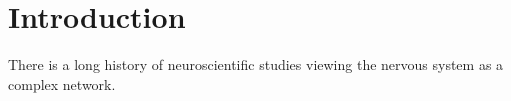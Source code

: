 \chapter*{Introduction}

There is a long history of neuroscientific studies viewing the nervous system as a complex network.\cite{sporns_structure_nodate} \TODO[dokončit]

